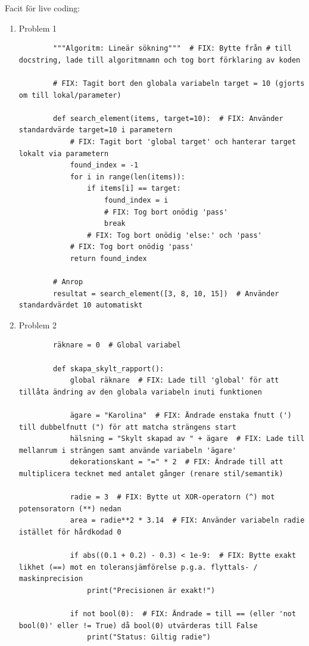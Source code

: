 \documentclass[11pt,a4paper]{article}
\begin{document}
Facit för live coding:
\begin{enumerate}
    \item Problem 1
    \begin{lstlisting}
        """Algoritm: Lineär sökning"""  # FIX: Bytte från # till docstring, lade till algoritmnamn och tog bort förklaring av koden

        # FIX: Tagit bort den globala variabeln target = 10 (gjorts om till lokal/parameter)

        def search_element(items, target=10):  # FIX: Använder standardvärde target=10 i parametern
            # FIX: Tagit bort 'global target' och hanterar target lokalt via parametern
            found_index = -1
            for i in range(len(items)):
                if items[i] == target:
                    found_index = i
                    # FIX: Tog bort onödig 'pass'
                    break
                # FIX: Tog bort onödig 'else:' och 'pass'
            # FIX: Tog bort onödig 'pass'
            return found_index

        # Anrop
        resultat = search_element([3, 8, 10, 15])  # Använder standardvärdet 10 automatiskt
    \end{lstlisting}
    \item Problem 2
    \begin{lstlisting}
        räknare = 0  # Global variabel

        def skapa_skylt_rapport():
            global räknare  # FIX: Lade till 'global' för att tillåta ändring av den globala variabeln inuti funktionen
            
            ägare = "Karolina"  # FIX: Ändrade enstaka fnutt (') till dubbelfnutt (") för att matcha strängens start
            hälsning = "Skylt skapad av " + ägare  # FIX: Lade till mellanrum i strängen samt använde variabeln 'ägare'
            dekorationskant = "=" * 2  # FIX: Ändrade till att multiplicera tecknet med antalet gånger (renare stil/semantik)
            
            radie = 3  # FIX: Bytte ut XOR-operatorn (^) mot potensoratorn (**) nedan 
            area = radie**2 * 3.14  # FIX: Använder variabeln radie istället för hårdkodad 0
            
            if abs((0.1 + 0.2) - 0.3) < 1e-9:  # FIX: Bytte exakt likhet (==) mot en toleransjämförelse p.g.a. flyttals- / maskinprecision
                print("Precisionen är exakt!")
                
            if not bool(0):  # FIX: Ändrade = till == (eller 'not bool(0)' eller != True) då bool(0) utvärderas till False
                print("Status: Giltig radie")
                

\end{lstlisting}
\end{enumerate}
\end{document}
